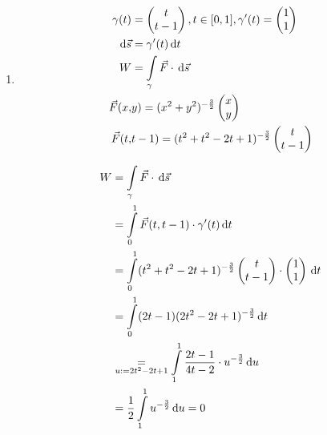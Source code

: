 \documentclass[fleqn,12pt]{scrartcl}
\newcommand{\id}{\, \mathrm{d}}
\newcommand{\intl}{\int\displaylimits}
\begin{document}
\begin{enumerate}
	\item
		\begin{align*}
		\gamma(t) &= \begin{pmatrix} t\\t-1\end{pmatrix}, t \in [0, 1], \gamma'(t) = \begin{pmatrix} 1\\ 1 \end{pmatrix} \\
		\id \vec s &= \gamma'(t) \id t\\
			W &= \intl_\gamma \vec F \cdot \id \vec s\\
		\vec F(x,& y) =  (x^2 + y^2) ^{-\frac32} \begin{pmatrix} x \\ y \end{pmatrix}\\
		\vec F(t,& t-1) = (t^2 + t^2 -2t + 1)^{-\frac32} \begin{pmatrix} t \\ t-1 \end{pmatrix}
		\end{align*}

		\begin{align*}
			W &= \intl_\gamma \vec F \cdot \id \vec s \\
				 &= \intl_0^1 \vec F(t, t-1) \cdot \gamma'(t) \id t\\
				 &= \intl_0^1 (t^2 + t^2 -2t + 1)^{-\frac32} \begin{pmatrix} t \\ t-1 \end{pmatrix} \cdot \begin{pmatrix}1\\1\end{pmatrix} \id t\\
				 &= \intl_0^1 (2t-1) (2t^2 -2t + 1)^{-\frac32} \id t\\
				 &\underset{u:=2t^2 -2t +1}{=} \intl_1^1 \frac{2t-1}{4t-2} \cdot u^{-\frac32}\id u \\
				 &= \frac12 \intl_1^1 u^{-\frac32} \id u = 0
		\end{align*}


\end{enumerate}
\end{document}
